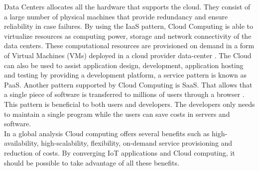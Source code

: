 Data Centers allocates all the hardware that supports the cloud. They consist of
a large number of physical machines that provide redundancy and ensure reliability
in case failures. By using the IaaS pattern, Cloud Computing is able to virtualize
resources as computing power, storage and network connectivity of the data centers.
These computational resources are provisioned on demand in a form of Virtual Machines (VMs)
deployed in a cloud provider data-center \cite{sotomayor2009virtual}. The Cloud can also
be used to assist application design, development, application hosting and testing by providing
a development platform, a service pattern is known as PaaS. Another pattern supported by
Cloud Computing is SaaS. That allows that a single piece of software is transferred to millions
of users through a browser \cite{zhang2010cloud}. This pattern is beneficial to both users
and developers. The developers only needs to maintain a single program while the users can
save costs in servers and software.\\

In a global analysis Cloud computing offers several benefits such as high-availability,
high-scalability, flexibility, on-demand service provisioning and reduction of costs.
By converging IoT applications and Cloud computing, it should be possible to take advantage
of all these benefits.
